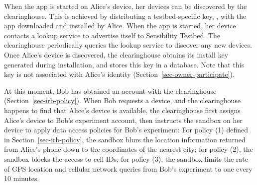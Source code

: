 When the app is started on Alice's device, her devices can be 
discovered by the clearinghouse. This is achieved
by distributing a testbed-specific key, ,
with the app downloaded and installed by Alice. When the app is
started, her device contacts a lookup service to advertise
itself to Sensibility Testbed. 
The clearinghouse periodically queries the lookup service to
discover any new devices. Once Alice's device is discovered, the
clearinghouse obtains its install key  generated
during installation, and stores this key in a database. Note that
this key is not associated with Alice's identity 
(Section~\ref{sec-owner-participate}).

At this moment,  Bob has obtained an account with the clearinghouse 
(Section~\ref{sec-irb-policy}).
When Bob requests a device, and the clearinghouse
happens to find that Alice's device is available, the
clearinghouse first 
assigns Alice's device to Bob's experiment account, 
then instructs the sandbox on her device to apply data
access policies for Bob's experiment: For policy (1) defined in
Section~\ref{sec-irb-policy}, the sandbox blurs the location
information returned from Alice's phone down to the coordinates
of the nearest city; for policy (2), the sandbox blocks the
access to cell IDs; for policy (3), the sandbox limits the rate
of GPS location and cellular network queries from Bob's
experiment to one every 10 minutes.